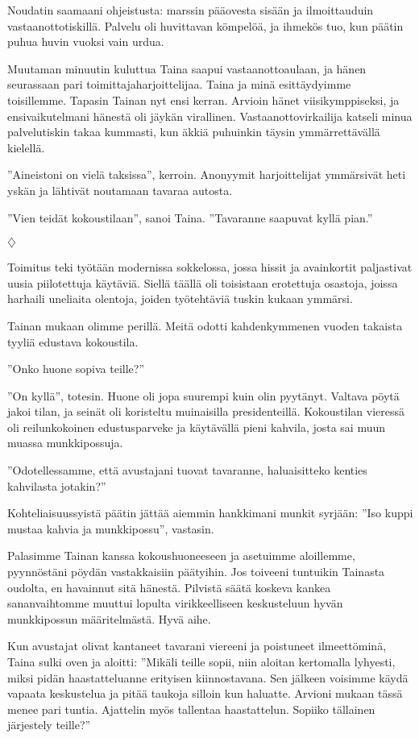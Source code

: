 ﻿\documentclass[a4paper, 12pt, finnish]{article}
\newcommand{\q}[1]{''#1''}
\def\jump{\vspace{2mm} \centerline{$\diamondsuit$} \vspace{2mm}}
\begin{document}
Noudatin saamaani ohjeistusta: marssin pääovesta sisään ja
ilmoittauduin vastaanottotiskillä. Palvelu oli huvittavan kömpelöä,
ja ihmekös tuo, kun päätin puhua huvin vuoksi
vain urdua.

Muutaman minuutin kuluttua Taina saapui vastaanottoaulaan,
ja hänen seurassaan pari toimittajaharjoittelijaa.
Taina ja minä esittäydyimme toisillemme. Tapasin Tainan nyt ensi kerran. Arvioin hänet viisikymppiseksi, ja ensivaikutelmani hänestä oli jäykän virallinen.
Vastaanottovirkailija katseli minua palvelutiskin takaa kummasti,
kun äkkiä puhuinkin täysin ymmärrettävällä kielellä.

\q{Aineistoni on vielä taksissa}, kerroin. Anonyymit harjoittelijat ymmärsivät
heti yskän ja lähtivät noutamaan tavaraa autosta.

\q{Vien teidät kokoustilaan}, sanoi Taina. \q{Tavaranne saapuvat kyllä pian.}


\jump


Toimitus teki työtään modernissa sokkelossa, jossa hissit ja
avainkortit paljastivat uusia piilotettuja käytäviä. Siellä täällä
oli toisistaan erotettuja osastoja, joissa harhaili uneliaita
olentoja, joiden työtehtäviä tuskin kukaan ymmärsi.

Tainan mukaan olimme perillä. Meitä odotti kahdenkymmenen vuoden
takaista tyyliä edustava kokoustila.

\q{Onko huone sopiva teille?}

\q{On kyllä}, totesin. Huone oli jopa suurempi kuin olin pyytänyt.
Valtava pöytä jakoi tilan, ja seinät oli koristeltu muinaisilla
presidenteillä. Kokoustilan vieressä oli reilunkokoinen
edustusparveke ja käytävällä pieni kahvila, josta sai muun
muassa munkkipossuja.

\q{Odotellessamme, että avustajani tuovat tavaranne,
haluaisitteko kenties kahvilasta jotakin?}

Kohteliaisuussyistä päätin
jättää aiemmin hankkimani munkit syrjään: \q{Iso kuppi mustaa kahvia
ja munkkipossu}, vastasin.

Palasimme Tainan kanssa kokoushuoneeseen ja asetuimme aloillemme,
pyynnöstäni pöydän vastakkaisiin päätyihin.
Jos toiveeni tuntuikin Tainasta oudolta, en havainnut sitä hänestä.
Pilvistä säätä koskeva kankea sananvaihtomme muuttui lopulta
virikkeelliseen keskusteluun hyvän munkkipossun määritelmästä.
Hyvä aihe.

Kun avustajat olivat kantaneet tavarani viereeni ja poistuneet
ilmeettöminä, Taina sulki oven ja aloitti:
\q{Mikäli teille sopii, niin aloitan kertomalla lyhyesti,
miksi pidän haastatteluanne erityisen kiinnostavana. Sen jälkeen
voisimme käydä vapaata keskustelua ja pitää taukoja silloin kun haluatte.
Arvioni mukaan tässä menee pari tuntia. Ajattelin myös tallentaa
haastattelun. Sopiiko tällainen järjestely teille?}
\end{document}
